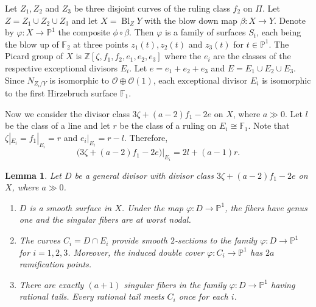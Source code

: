 \documentclass[11]{amsart}
\theoremstyle{plain}
\newtheorem{lemma}[theorem]{Lemma}
\theoremstyle{definition}
\newcommand{\OO}{\mathcal O}
\newcommand{\Bl}{\operatorname{Bl}}
\newcommand{\bbF}{\mathbb F}
\newcommand{\bbP}{\mathbb P}
\newcommand{\bbZ}{\mathbb Z}
\begin{document}
Let $Z_{1}, Z_{2}$ and $Z_{3}$ be three disjoint curves of the ruling class $f_{2}$ on $\Pi$. Let $Z = Z_{1} \cup Z_{2} \cup Z_{3}$ and let $X = \Bl_{Z}Y$ with the blow down map $\beta : X \to Y$.  Denote by $\varphi: X \to \bbP^1$ the composite $\phi\circ\beta$. Then $\varphi$ is a family of surfaces $S_{t}$, each being the blow up of $\bbF_{2}$ at three points $z_{1}(t), z_{2}(t)$ and $z_{3}(t)$ for $t \in \bbP^1$.  The Picard group of $X$ is 
$ \bbZ[\zeta, f_{1}, f_{2}, e_{1}, e_{2}, e_{3}]$ where the $e_{i}$ are the classes of the respective exceptional divisors $E_{i}$.  Let 
$e = e_{1} + e_{2} + e_{3}$ and $E = E_{1} \cup E_{2} \cup E_{3}$. Since 
$N_{Z_i/Y}$ is isomorphic to $\OO \oplus \OO(1)$, each exceptional divisor $E_{i}$ is isomorphic to the first Hirzebruch surface $\bbF_{1}$. 

Now we consider the divisor class $3\zeta + (a-2)f_{1} - 2e$ 
on $X$, where $a \gg 0$. 
Let $l$ be the class of a line and let $r$ be  the class of a ruling on $E_i\cong \bbF_{1}$. Note that 
$\zeta|_{E_i} = f_1|_{E_i} = r$ and $e_{i}|_{E_i} = r-l$. Therefore, 
$$ \big(3\zeta + (a-2)f_{1} - 2e\big) |_{E_i} =  2l + (a-1)r. $$

\begin{lemma}\label{gen_D} 
Let $D$ be a general divisor with divisor class $3\zeta + (a-2)f_{1} -2e$ on  $X$, where $a\gg 0$.
\begin{enumerate}[label={\upshape(\roman*)}]
\item $D$ is a smooth surface in $X$. Under the map $\varphi : D \to \bbP^1$, the fibers have genus one and the singular fibers are at worst nodal. 

\item The curves $C_{i} = D \cap E_{i}$ provide smooth $2$-sections to the family $\varphi : D \to \bbP^1$ for $i=1,2,3$. Moreover, the induced double cover $\varphi: C_{i} \to \bbP^1$ has $2a$ ramification points. 

\item There are exactly $(a+1)$ singular fibers in the family $\varphi : D \to \bbP^1$ having rational tails. Every rational tail meets $C_{i}$ once for each $i$. 
\end{enumerate}
\end{lemma}
\end{document}
